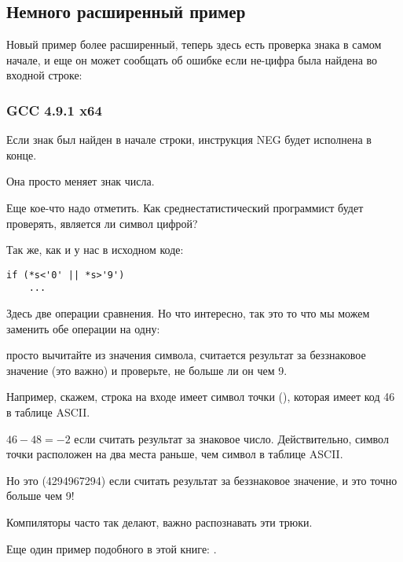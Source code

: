 \subsection{Немного расширенный пример}

Новый пример более расширенный, теперь здесь есть проверка знака  в самом начале,
и еще он может сообщать об ошибке если не-цифра была найдена во входной строке:



\subsubsection{\Optimizing GCC 4.9.1 x64}



Если знак  был найден в начале строки, инструкция NEG будет исполнена в конце.

Она просто меняет знак числа.

\label{one_comparison_instead_of_two}
Еще кое-что надо отметить.
Как среднестатистический программист будет проверять, является ли символ цифрой?

Так же, как и у нас в исходном коде:

\begin{lstlisting}[style=customc]
if (*s<'0' || *s>'9')
    ...
\end{lstlisting}

Здесь две операции сравнения.
Но что интересно, так это то что мы можем заменить обе операции на одну:

просто вычитайте  из значения символа,
считается результат за беззнаковое значение (это важно) и проверьте, не больше ли он чем 9.

Например, скажем, строка на входе имеет символ точки (), которая имеет код 46 в таблице \ac{ASCII}.

$46-48=-2$ если считать результат за знаковое число.
Действительно, символ точки расположен на два места раньше, чем символ  в таблице \ac{ASCII}.

Но это  (4294967294) если считать результат за беззнаковое значение, 
и это точно больше чем 9!

Компиляторы часто так делают, важно распознавать эти трюки.

Еще один пример подобного в этой книге: 
.

